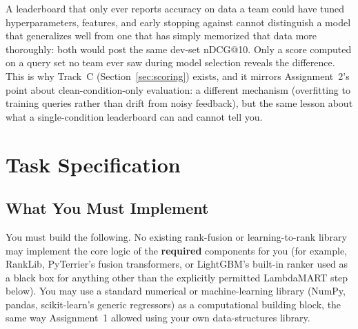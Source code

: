 \documentclass[10pt]{article}
\begin{document}
A leaderboard that only ever reports accuracy on data a team could have tuned hyperparameters, features, and early stopping against cannot distinguish a model that generalizes well from one that has simply memorized that data more thoroughly: both would post the same dev-set nDCG@10. Only a score computed on a query set no team ever saw during model selection reveals the difference. This is why Track~C (Section~\ref{sec:scoring}) exists, and it mirrors Assignment~2's point about clean-condition-only evaluation: a different mechanism (overfitting to training queries rather than drift from noisy feedback), but the same lesson about what a single-condition leaderboard can and cannot tell you.

\section{Task Specification}

\subsection{What You Must Implement}
\label{sec:implement}

You must build the following. No existing rank-fusion or learning-to-rank library may implement the core logic of the \textbf{required} components for you (for example, RankLib, PyTerrier's fusion transformers, or LightGBM's built-in ranker used as a black box for anything other than the explicitly permitted LambdaMART step below). You may use a standard numerical or machine-learning library (NumPy, pandas, scikit-learn's generic regressors) as a computational building block, the same way Assignment~1 allowed using your own data-structures library.
\end{document}
